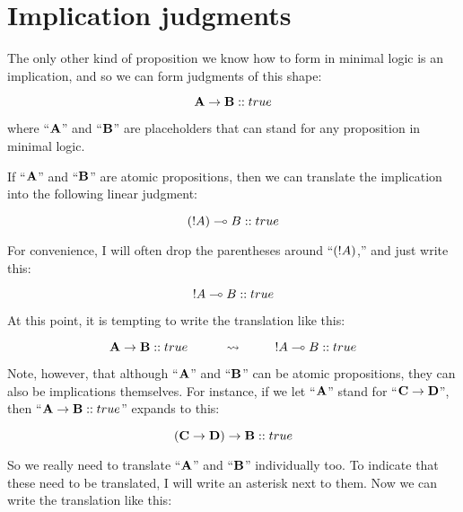 \documentclass[../../../main.tex]{subfiles}
\begin{document}
\section{Implication judgments}

The only other kind of proposition we know how to form in minimal logic is an implication, and so we can form judgments of this shape:

\begin{equation*}
  \nd{A \impl/ B} :: true
\end{equation*}

\noindent
where ``$\mathbf{A}$'' and ``$\mathbf{B}$'' are placeholders that can stand for any proposition in minimal logic. 

If ``$\mathbf{A}$'' and ``$\mathbf{B}$'' are atomic propositions, then we can translate the implication into the following linear judgment:

\begin{equation*}
  (\bang/A) \lolli/ B :: true
\end{equation*}

\noindent
For convenience, I will often drop the parentheses around ``$(\bang/A)$,'' and just write this:

\begin{equation*}
  \bang/A \lolli/ B :: true
\end{equation*}

\noindent
At this point, it is tempting to write the translation like this:

\begin{equation*}
  \nd{A \impl/ B} :: true \hskip 1cm \rightsquigarrow \hskip 1cm \bang/A \lolli/ B :: true
\end{equation*}

\noindent
Note, however, that although ``$\mathbf{A}$'' and ``$\mathbf{B}$'' can be atomic propositions, they can also be implications themselves. For instance, if we let ``$\mathbf{A}$'' stand for ``$\nd{C \impl/ D}$'', then ``$\nd{A \impl/ B} :: true$'' expands to this:

\begin{equation*}
  \nd{(C \impl/ D) \impl/ B} :: true
\end{equation*}

\noindent
So we really need to translate ``$\mathbf{A}$'' and ``$\mathbf{B}$'' individually too. To indicate that these need to be translated, I will write an asterisk next to them. Now we can write the translation like this:
\end{document}
